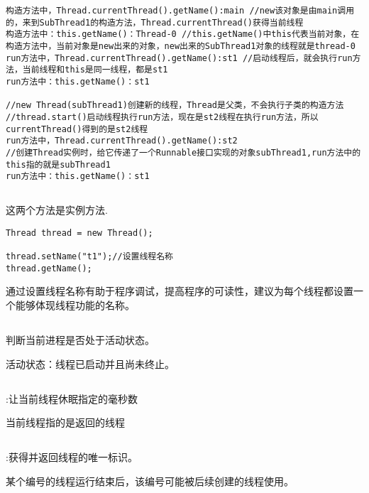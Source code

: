 \documentclass[a4paper]{report}
\begin{document}
\begin{lstlisting}[title = 运行结果]
构造方法中，Thread.currentThread().getName():main //new该对象是由main调用的，来到SubThread1的构造方法，Thread.currentThread()获得当前线程
构造方法中：this.getName()：Thread-0 //this.getName()中this代表当前对象，在构造方法中，当前对象是new出来的对象，new出来的SubThread1对象的线程就是thread-0
run方法中，Thread.currentThread().getName():st1 //启动线程后，就会执行run方法，当前线程和this是同一线程，都是st1
run方法中：this.getName()：st1

//new Thread(subThread1)创建新的线程，Thread是父类，不会执行子类的构造方法
//thread.start()启动线程执行run方法，现在是st2线程在执行run方法，所以currentThread()得到的是st2线程
run方法中，Thread.currentThread().getName():st2
//创建Thread实例时，给它传递了一个Runnable接口实现的对象subThread1,run方法中的this指的就是subThread1
run方法中：this.getName()：st1
\end{lstlisting}
\subsection{}
这两个方法是实例方法.

\begin{lstlisting}
Thread thread = new Thread();

thread.setName("t1");//设置线程名称
thread.getName();
\end{lstlisting}
通过设置线程名称有助于程序调试，提高程序的可读性，建议为每个线程都设置一个能够体现线程功能的名称。
\subsection{}
判断当前进程是否处于活动状态。

活动状态：线程已启动并且尚未终止。

\subsection{}
:让当前线程休眠指定的毫秒数

当前线程指的是返回的线程
\subsection{}
:获得并返回线程的唯一标识。

某个编号的线程运行结束后，该编号可能被后续创建的线程使用。
\end{document}
